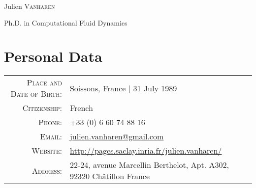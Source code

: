 \documentclass[a4paper,10pt]{article}
\begin{document}
\pagestyle{empty}
\par{\begin{center}
		{\Huge Julien \textsc{Vanharen}}
		\smallskip\par{\Large Ph.D. in Computational Fluid Dynamics} \end{center}}
\smallskip\par

\section{Personal Data}
\begin{tabular}{rl}
    \textsc{Place and Date of Birth:}   & Soissons, France | 31 July 1989 \\
    \textsc{Citizenship:}               & French \\
    \textsc{Phone:}                     & +33 (0) 6 60 74 88 16 \\
    \textsc{Email:}                     & \href{mailto:julien.vanharen@gmail.com}{julien.vanharen@gmail.com} \\
    \textsc{Website:}                   & \url{http://pages.saclay.inria.fr/julien.vanharen/} \\
    \textsc{Address:}                   & 22-24, avenue Marcellin Berthelot, Apt. A302, 92320 Ch\^atillon France \\
\end{tabular}
\end{document}
